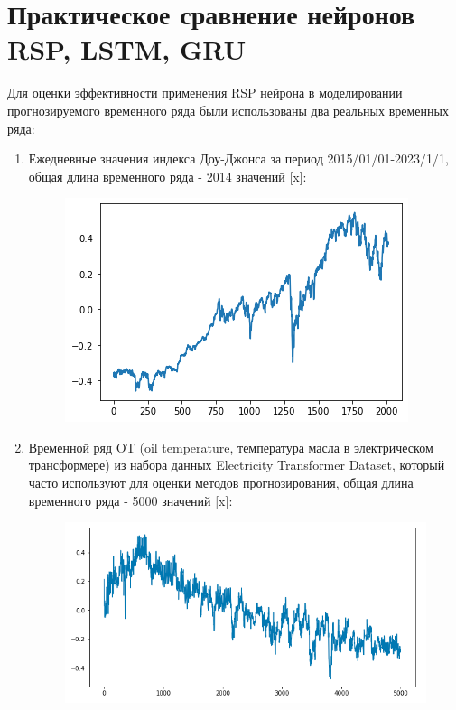 \documentclass[11pt]{article}
\begin{document}
\section*{Практическое сравнение нейронов RSP, LSTM, GRU}
Для оценки эффективности применения RSP нейрона в моделировании прогнозируемого временного ряда были использованы два реальных временных ряда:
\begin{enumerate}
  \item Ежедневные значения индекса Доу-Джонса за период 2015/01/01-2023/1/1, общая длина временного ряда - 2014 значений [x]:
\begin{figure}[H]
\centering
\includegraphics[scale=0.5]{dji_2015_01_01_2023_01_01.png}
\label{}
\end{figure}
  \item Временной ряд OT (oil temperature, температура масла в электрическом трансформере) из набора данных Electricity Transformer Dataset, который часто используют для оценки методов прогнозирования, общая длина временного ряда - 5000 значений [x]:
\begin{figure}[H]
\centering
\includegraphics[scale=0.5]{etth_ot_time_series.png}
\label{}
\end{figure}
\end{enumerate}
\end{document}
